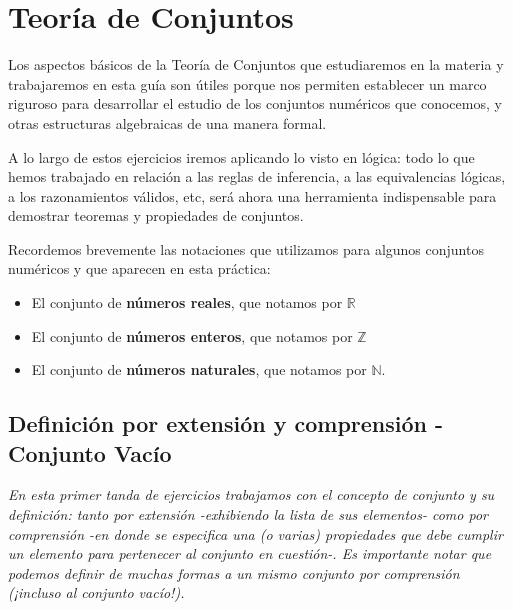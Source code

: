 \chapter{Teor\'ia de Conjuntos}

Los aspectos básicos de la Teoría de Conjuntos que estudiaremos en la materia y trabajaremos en esta guía son útiles porque nos permiten establecer un marco riguroso para desarrollar el estudio de los conjuntos numéricos que conocemos, y otras estructuras algebraicas de una manera formal.

A lo largo de estos ejercicios iremos aplicando lo visto en lógica: todo lo que hemos trabajado en relación a las reglas
de inferencia, a las equivalencias lógicas, a los razonamientos válidos, etc, será ahora una herramienta indispensable para
demostrar teoremas y propiedades de conjuntos.

Recordemos brevemente las notaciones que utilizamos para algunos conjuntos numéricos y que aparecen en esta
práctica:

\begin{itemize}
	\item El conjunto de \textbf{números reales}, que notamos por $\mathbb{R}$
	
	\item El conjunto de \textbf{números enteros}, que notamos por $\mathbb{Z}$
	
	\item El conjunto de \textbf{números naturales}, que notamos por $\mathbb{N}$.
\end{itemize}

\hspace*{-1.5cm}

\section{Definici\'on por extensi\'on y comprensi\'on - Conjunto Vac\'io}

\textit{En esta primer tanda de ejercicios trabajamos con el concepto de conjunto y su definición: tanto por extensión -exhibiendo la lista de sus elementos- como por comprensión -en donde se especifica una (o varias) propiedades que debe cumplir un elemento para pertenecer al conjunto en cuestión-. Es importante notar que podemos definir de muchas formas a un mismo conjunto por comprensión (¡incluso al conjunto vacío!).}

